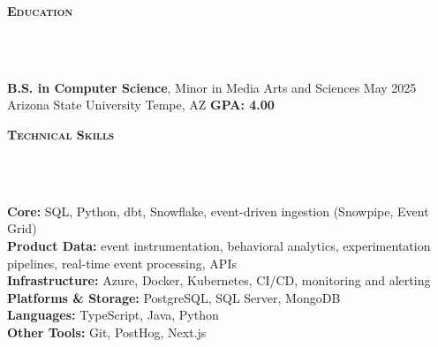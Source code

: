 \documentclass[10pt]{article}
\newcommand{\lineunder} {
    \vspace*{-10pt} \\
    \hspace*{-18pt} \hrulefill \\
    \vspace*{2pt}
}
\newcommand{\header} [1] {
  \vspace*{2pt}
    {\hspace*{-15pt}\textsc{#1}}
    \lineunder
}
\begin{document}
\header{\textbf{Education}}
\textbf{B.S. in Computer Science}, Minor in Media Arts and Sciences \hfill May 2025\\
Arizona State University \hfill Tempe, AZ \textbar{} \textbf{GPA: 4.00}

\header{\textbf{Technical Skills}}
\textbf{Core:} SQL, Python, dbt, Snowflake, event-driven ingestion (Snowpipe, Event Grid)\\
\textbf{Product Data:} event instrumentation, behavioral analytics, experimentation pipelines, real-time event processing, APIs\\
\textbf{Infrastructure:} Azure, Docker, Kubernetes, CI/CD, monitoring and alerting\\
\textbf{Platforms \& Storage:} PostgreSQL, SQL Server, MongoDB\\
\textbf{Languages:} TypeScript, Java, Python\\
\textbf{Other Tools:} Git, PostHog, Next.js
\end{document}
